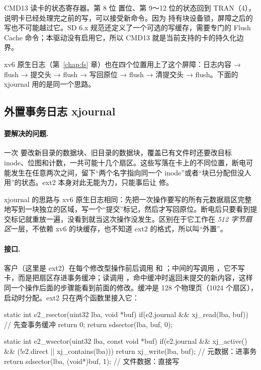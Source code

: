 CMD13 读卡的状态寄存器。第 8 位  置位、第 9～12 位的状态回到 TRAN（4），说明卡已经处理完之前的写，可以接受新命令。因为  持有块设备锁，屏障之后的写也不可能越过它。SD 6.x 规范还定义了一个可选的写缓存，需要专门的 Flush Cache 命令；本驱动没有启用它，所以 CMD13 就是当前支持的卡的持久化边界。

xv6 原生日志（第~\ref{chap:fs} 章）也在四个位置用上了这个屏障：日志内容 → flush → 提交头 → flush → 写回原位 → flush → 清提交头 → flush。下面的 xjournal 用的是同一个思路。

\subsection{外置事务日志 xjournal}

\paragraph{要解决的问题.} 一次  要改新目录的数据块、旧目录的数据块，覆盖已有文件时还要改目标 inode、位图和计数，一共可能十几个扇区。这些写落在卡上的不同位置，断电可能发生在任意两次之间，留下“两个名字指向同一个 inode”或者“块已分配但没人用”的状态。ext2 本身对此无能为力，只能事后让  修。

xjournal 的思路与 xv6 原生日志相同：先把一次操作要写的所有元数据扇区完整地写到一块独立的区域，写一个“提交”标记，然后才写回原位。断电后只要看到提交标记就重放一遍，没看到就当这次操作没发生。区别在于它工作在 \emph{512 字节扇区}一层，不依赖 xv6 的块缓存，也不知道 ext2 的格式，所以叫“外置”。

\paragraph{接口.} 客户（这里是 ext2）在每个修改型操作前后调用  和 ；中间的写调用 ，它不写卡，而是把扇区存进事务缓冲；读调用 ，命中缓冲时返回未提交的新内容，这样同一个操作后面的步骤能看到前面的修改。缓冲是 128 个物理页（1024 个扇区），启动时分配。ext2 只在两个函数里接入它：

\begin{ccode}
static int e2_rsector(uint32 lba, void *buf) {
  if(e2.journal && xj_read(lba, buf))                       // 先查事务缓冲
    return 0;
  return sdsector(lba, buf, 0);
}

static int e2_wsector(uint32 lba, const void *buf) {
  if(e2.journal && xj_active() && (!e2.direct || xj_contains(lba)))
    return xj_write(lba, buf);                              // 元数据：进事务
  return sdsector(lba, (void*)buf, 1);                      // 文件数据：直接写
}
\end{ccode}

